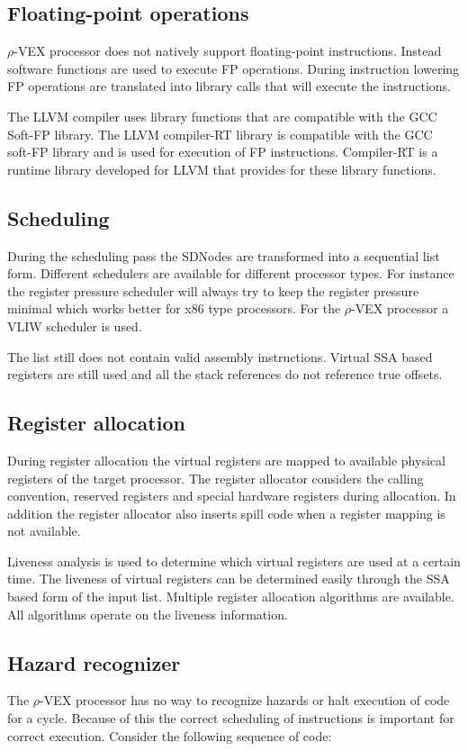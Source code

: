 \subsection{Floating-point operations}
$\rho$-VEX processor does not natively support floating-point instructions. Instead software functions are used to execute FP operations. During instruction lowering FP operations are translated into library calls that will execute the instructions.

The LLVM compiler uses library functions that are compatible with the GCC Soft-FP library. The LLVM compiler-RT library is compatible with the GCC soft-FP library and is used for execution of FP instructions. Compiler-RT is a runtime library developed for LLVM that provides for these library functions.

\subsection{Scheduling}
During the scheduling pass the SDNodes are transformed into a sequential list form. Different schedulers are available for different processor types. For instance the register pressure scheduler will always try to keep the register pressure minimal which works better for x86 type processors. For the $\rho$-VEX processor a VLIW scheduler is used.

The list still does not contain valid assembly instructions. Virtual SSA based registers are still used and all the stack references do not reference true offsets.

\subsection{Register allocation}
During register allocation the virtual registers are mapped to available physical registers of the target processor. The register allocator considers the calling convention, reserved registers and special hardware registers during allocation. In addition the register allocator also inserts spill code when a register mapping is not available.

Liveness analysis is used to determine which virtual registers are used at a certain time. The liveness of virtual registers can be determined easily through the SSA based form of the input list. Multiple register allocation algorithms are available. All algorithms operate on the liveness information.

\subsection{Hazard recognizer}
The $\rho$-VEX processor has no way to recognize hazards or halt execution of code for a cycle. Because of this the correct scheduling of instructions is important for correct execution. Consider the following sequence of code:

